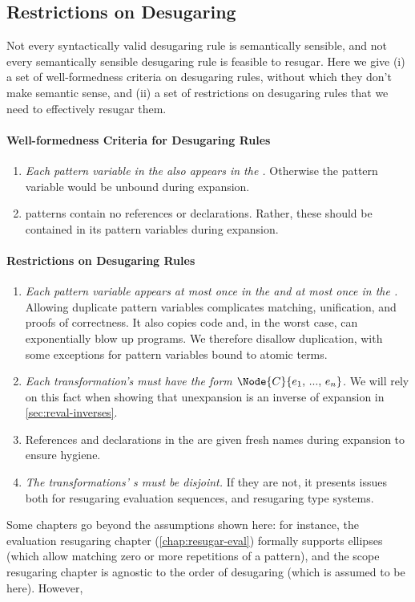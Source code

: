 \subsection{Restrictions on Desugaring}\label{sec:formal-reqs}

Not every syntactically valid desugaring rule is semantically
sensible, and not every semantically sensible desugaring rule is
feasible to resugar. Here we give (i) a set of well-formedness
criteria on desugaring rules, without which they don't make semantic
sense, and (ii) a set of restrictions on desugaring rules that we need
to effectively resugar them.

\paragraph{Well-formedness Criteria for Desugaring Rules}
\begin{enumerate}
\item \emph{Each pattern variable in the  also appears in the
  .} Otherwise the pattern variable would be unbound during
  expansion.
\item {} patterns contain no references or declarations. Rather, these
  should be contained in its pattern variables during expansion.
\end{enumerate}

\paragraph{Restrictions on Desugaring Rules}
\begin{enumerate}
\item \emph{Each pattern variable appears at most once in the  and at
  most once in the .}
  Allowing duplicate pattern variables complicates matching, unification,
  and proofs of correctness. It also copies code
  and, in the worst case, can exponentially blow up programs.
  We therefore disallow duplication,
  with some exceptions for pattern variables bound to atomic terms.
\item \emph{Each transformation's  must have the form
  $\Node{C}{e_1,\,...,\,e_n}$.} We will rely on this fact when showing that
  unexpansion is an inverse of expansion in \cref{sec:reval-inverses}.
\item References and declarations in the  are given fresh names during
  expansion to ensure hygiene.
\item \emph{The transformations' s must be disjoint.} If they
  are not, it presents issues both for resugaring evaluation sequences,
  and resugaring type systems.
\end{enumerate}

Some chapters go beyond the assumptions shown here: for instance, the
evaluation resugaring chapter (\cref{chap:resugar-eval}) formally
supports ellipses (which allow matching zero or more repetitions of a
pattern), and the scope resugaring chapter is agnostic to the order of
desugaring (which is assumed to be  here). However, 
